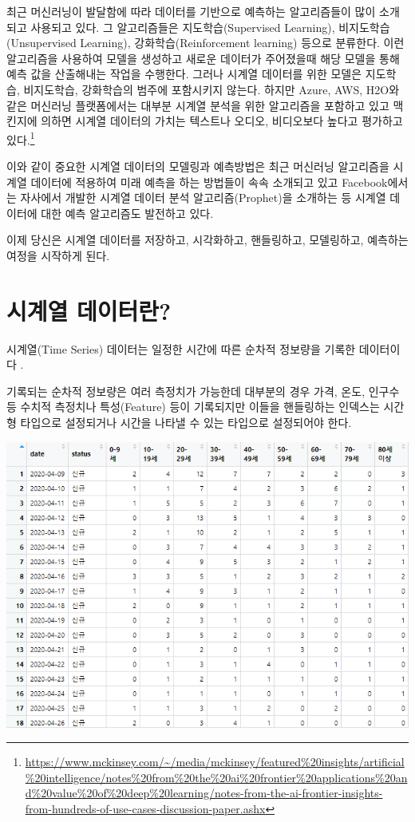 \documentclass[
]{book}
\begin{document}
최근 머신러닝이 발달함에 따라 데이터를 기반으로 예측하는 알고리즘들이 많이 소개되고 사용되고 있다. 그 알고리즘들은 지도학습(Supervised Learning), 비지도학습(Unsupervised Learning), 강화학습(Reinforcement learning) 등으로 분류한다. 이런 알고리즘을 사용하여 모델을 생성하고 새로운 데이터가 주어졌을때 해당 모델을 통해 예측 값을 산출해내는 작업을 수행한다. 그러나 시계열 데이터를 위한 모델은 지도학습, 비지도학습, 강화학습의 범주에 포함시키지 않는다. 하지만 Azure, AWS, H2O와 같은 머신러닝 플랫폼에서는 대부분 시계열 분석을 위한 알고리즘을 포함하고 있고 맥킨지에 의하면 시계열 데이터의 가치는 텍스트나 오디오, 비디오보다 높다고 평가하고 있다.\footnote{\url{https://www.mckinsey.com/~/media/mckinsey/featured\%20insights/artificial\%20intelligence/notes\%20from\%20the\%20ai\%20frontier\%20applications\%20and\%20value\%20of\%20deep\%20learning/notes-from-the-ai-frontier-insights-from-hundreds-of-use-cases-discussion-paper.ashx}}

이와 같이 중요한 시계열 데이터의 모델링과 예측방법은 최근 머신러닝 알고리즘을 시계열 데이터에 적용하여 미래 예측을 하는 방법들이 속속 소개되고 있고 Facebook에서는 자사에서 개발한 시계열 데이터 분석 알고리즘(Prophet)을 소개하는 등 시계열 데이터에 대한 예측 알고리즘도 발전하고 있다.

이제 당신은 시계열 데이터를 저장하고, 시각화하고, 핸들링하고, 모델링하고, 예측하는 여정을 시작하게 된다.

\hypertarget{uxc2dcuxacc4uxc5f4-uxb370uxc774uxd130uxb780}{%
\section{시계열 데이터란?}\label{uxc2dcuxacc4uxc5f4-uxb370uxc774uxd130uxb780}}

시계열(Time Series) 데이터는 일정한 시간에 따른 순차적 정보량을 기록한 데이터이다 .

기록되는 순차적 정보량은 여러 측정치가 가능한데 대부분의 경우 가격, 온도, 인구수 등 수치적 측정치나 특성(Feature) 등이 기록되지만 이들을 핸들링하는 인덱스는 시간형 타입으로 설정되거나 시간을 나타낼 수 있는 타입으로 설정되어야 한다.

\includegraphics{20210221_002952.png}
\end{document}
